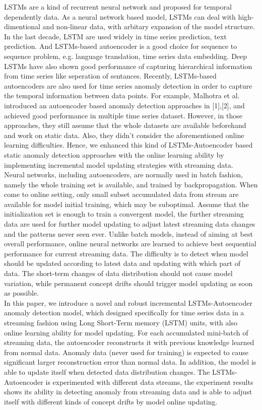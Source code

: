 LSTMs are a kind of recurrent neural network and proposed for temporal dependently data. As a neural network based model, LSTMs can deal with high-dimentional and non-linear data, with arbitary expansion of the model structure. In the last decade, LSTM are used widely in time series prediction, text prediction. And LSTMs-based autoencoder is a good choice for sequence to sequence problem, e.g. language translation, time series data embedding. Deep LSTMs have also shown good performance of capturing hierarchical information from time series like seperation of sentances. Recently, LSTMs-based autoencoders are also used for time series anomaly detection in order to capture the temporal information between data points. For example, Malhotra et al. introduced an autoencoder based anomaly detection approaches in [1],[2], and achieved good performance in multiple time series dataset. However, in those approaches, they still assume that the whole datasets are available beforehand and work on static data. Also, they didn’t consider the aforementioned online learning difficulties. Hence, we enhanced this kind of LSTMs-Autoencoder based static anomaly detection approaches with the online learning ability by implementing incremental model updating strategies with streaming data.\\

Neural networks, including autoencoders, are normally used in batch fashion, namely the whole training set is available, and trained by backpropagation. When come to online setting, only small subset accumulated data from stream are available for model initial training, which may be suboptimal. Assume that the initialization set is enough to train a convergent model, the further streaming data are used for further model updating to adjust latest streaming data changes and the patterns never seen ever. Unlike batch models, instead of aiming at best overall performance, online neural networks are learned to achieve best sequential performance for current streaming data. The difficulty is to detect when model should be updated according to latest data and updating with which part of data. The short-term changes of data distribution should not cause model variation, while permanent concept drifts should trigger model updating as soon as possible.\\

In this paper, we introduce a novel and robust incremental LSTMs-Autoencoder anomaly detection model, which designed specifically for time series data in a streaming fashion using Long Short-Term memory (LSTM) units, with also online learning ability for model updating. For each accumulated mini-batch of streaming data, the autoencoder reconstructs it with previous knowledge learned from normal data. Anomaly data (never used for training) is expected to cause significant larger reconstruction error than normal data. In addition, the model is able to update itself when detected data distribution changes. The LSTMs-Autoencoder is experimented with different data streams, the experiment results shows its ability in detecting anomaly from streaming data and is able to adjust itself with different kinds of concept drifts by model online updating.\\


